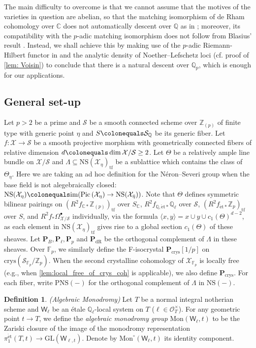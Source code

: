 \documentclass[11pt, letterpaper]{amsart}
\theoremstyle{plain}
\theoremstyle{definition}
\newtheorem{definition}[theorem]{Definition}
\newcommand{\IC}{\mathbb{C}}
\newcommand{\IF}{\mathbb{F}}
\newcommand{\IQ}{\mathbb{Q}}
\newcommand{\IZ}{\mathbb{Z}}
\newcommand{\<}{\langle}
\renewcommand{\>}{\rangle}
\newcommand{\Ohm}{\Omega}
\newcommand{\Pic}{\mathrm{Pic}\,}
\newcommand{\sO}{\mathcal{O}}
\newcommand{\NS}{\mathrm{NS}}
\newcommand{\et}{\mathrm{{\acute{e}}t}}
\newcommand{\sX}{\mathcal{X}}
\newcommand{\crys}{\mathrm{crys}}
\newcommand{\PNS}{\mathrm{PNS}}
\newcommand{\sfW}{\mathsf{W}}
\newcommand{\sS}{\mathcal{S}}
\newcommand{\bP}{\mathbf{P}}
\newcommand{\dR}{\mathrm{dR}}
\newcommand{\tf}{\mathrm{tf}}
\begin{document}
The main difficulty to overcome is that we cannot assume that the motives of the varieties in question are abelian, so that the matching isomorphism of de Rham cohomology over $\IC$ does not automatically descent over $\IQ$ as in \cite[Prop.~5.6(2)]{MPTate}; moreover, its compatibility with the $p$-adic matching isomorphism does not follow from Blasius' result \cite{Blasius}.
Instead, we shall achieve this by making use of the $p$-adic Riemann-Hilbert functor in \cite{DLLZ} and the analytic density of Noether--Lefschetz loci (cf. proof of \cref{lem: Voisin}) to conclude that there is a natural descent over $\IQ_p$, which is enough for our applications. 

\subsection{General set-up}
\label{sub: period_setup}
Let $p > 2$ be a prime and $\sS$ be a smooth connected scheme over $\IZ_{(p)}$ of finite type with generic point $\eta$ and $S \colonequals \sS_\IQ$ be its generic fiber. 
Let $f : \sX \to \sS$ be a smooth projective morphism with geometrically connected fibers of relative dimension $d \colonequals \dim \sX / \sS \geq 2$. 
Let $\Theta$ be a relatively ample line bundle on $\sX/\sS$ and $\Lambda \subseteq \NS(\sX_\eta)_{\mathrm{tf}}$ be a sublattice which contains the class of $\Theta_\eta$. 
Here we are taking an ad hoc definition for the N\'eron--Severi group when the base field is not alegebraically closed: $\NS(\sX_\eta) \colonequals \mathrm{im}(\Pic(\sX_\eta) \to \NS(\sX_{\bar{\eta}}))$. 
Note that $\Theta$ defines symmetric bilinear pairings on $(R^2 f_{\IC *} \IZ_{(p)})_\tf$ over $S_\IC$, $R^2 f_{\IQ, \et *} \IQ_\ell$ over $\sS$, $(R^2 f_{\et *} \IZ_p)_\tf$ over $S$, and $R^2 f_{*} \Ohm^\bullet_{\sX/\sS}$ individually, via the formula $\< x, y \> = x \cup y \cup c_1(\Theta)^{d - 2}$, as each element in $\NS(\sX_\eta)_{\mathrm{tf}}$ gives rise to a global section $c_1(\Theta)$ of these sheaves. 
Let $\bP_{B}, \bP_\ell, \bP_p$ and $\bP_\dR$ be the orthogonal complement of $\Lambda$ in these sheaves. Over $\IF_p$, we similarly define the F-isocrystal $\bP_\crys[1/p]$ on $\crys(\sS_{\IF_p}/\IZ_p)$. When the second crystalline cohomology of $\sX_{\IF_p}$ is locally free (e.g., when \cref{lem:local_free_of_crys_coh} is applicable), we also define $\bP_\crys$. For each fiber, write $\PNS(-)$ for the orthogonal complement of $\Lambda$ in $\NS(-)$. 


\begin{definition}
    \emph{(Algebraic Monodromy)} Let $T$ be a normal integral notherian scheme and $\sfW_\ell$ be an \'etale $\IQ_\ell$-local system on $T$ ($\ell \in \sO_T^\times$). For any geometric point $t \to T$, we define the \textit{algebraic monodromy group} $\mathrm{Mon}(\sfW_\ell, t)$ to be the Zariski closure of the image of the monodromy representation $\pi_1^\et(T, t) \to \mathrm{GL}(\sfW_{\ell, t})$. Denote by $\mathrm{Mon}^\circ(\sfW_\ell, t)$ its identity component. 
\end{definition}
\end{document}
